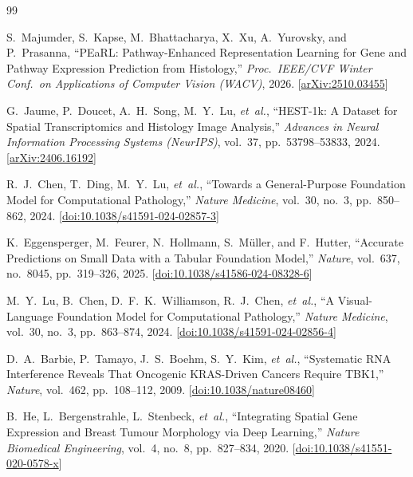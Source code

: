 \documentclass[conference]{IEEEtran}
\begin{document}

\begin{thebibliography}{99}

S.~Majumder, S.~Kapse, M.~Bhattacharya, X.~Xu, A.~Yurovsky,
and P.~Prasanna,
``PEaRL: Pathway-Enhanced Representation Learning for Gene and Pathway
Expression Prediction from Histology,''
\textit{Proc.\ IEEE/CVF Winter Conf.\ on Applications of Computer Vision
(WACV)}, 2026.
[\href{https://arxiv.org/abs/2510.03455}{arXiv:2510.03455}]

G.~Jaume, P.~Doucet, A.~H.~Song, M.~Y.~Lu, \textit{et~al.},
``HEST-1k: A Dataset for Spatial Transcriptomics and Histology Image
Analysis,''
\textit{Advances in Neural Information Processing Systems (NeurIPS)},
vol.~37, pp.~53798--53833, 2024.
[\href{https://arxiv.org/abs/2406.16192}{arXiv:2406.16192}]

R.~J.~Chen, T.~Ding, M.~Y.~Lu, \textit{et~al.},
``Towards a General-Purpose Foundation Model for Computational Pathology,''
\textit{Nature Medicine}, vol.~30, no.~3, pp.~850--862, 2024.
[\href{https://doi.org/10.1038/s41591-024-02857-3}{doi:10.1038/s41591-024-02857-3}]

K.~Eggensperger, M.~Feurer, N.~Hollmann, S.~M\"{u}ller,
and F.~Hutter,
``Accurate Predictions on Small Data with a Tabular Foundation Model,''
\textit{Nature}, vol.~637, no.~8045, pp.~319--326, 2025.
[\href{https://doi.org/10.1038/s41586-024-08328-6}{doi:10.1038/s41586-024-08328-6}]

M.~Y.~Lu, B.~Chen, D.~F.~K.~Williamson, R.~J.~Chen, \textit{et~al.},
``A Visual-Language Foundation Model for Computational Pathology,''
\textit{Nature Medicine}, vol.~30, no.~3, pp.~863--874, 2024.
[\href{https://doi.org/10.1038/s41591-024-02856-4}{doi:10.1038/s41591-024-02856-4}]

D.~A.~Barbie, P.~Tamayo, J.~S.~Boehm, S.~Y.~Kim, \textit{et~al.},
``Systematic RNA Interference Reveals That Oncogenic KRAS-Driven Cancers
Require TBK1,''
\textit{Nature}, vol.~462, pp.~108--112, 2009.
[\href{https://doi.org/10.1038/nature08460}{doi:10.1038/nature08460}]

B.~He, L.~Bergenstrahle, L.~Stenbeck, \textit{et~al.},
``Integrating Spatial Gene Expression and Breast Tumour Morphology via
Deep Learning,''
\textit{Nature Biomedical Engineering}, vol.~4, no.~8, pp.~827--834, 2020.
[\href{https://doi.org/10.1038/s41551-020-0578-x}{doi:10.1038/s41551-020-0578-x}]


\end{thebibliography}
\end{document}
